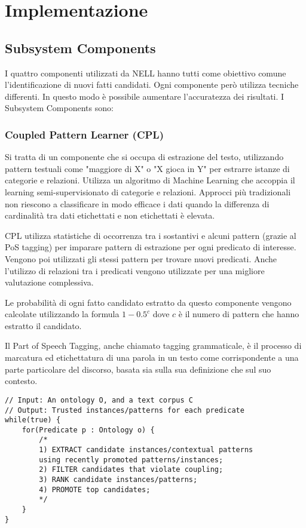 \section{Implementazione}
\label{impl}
\subsection{Subsystem Components}
I quattro componenti utilizzati da NELL hanno tutti come obiettivo comune l'identificazione di nuovi fatti candidati. Ogni componente però utilizza tecniche differenti. In questo modo è possibile aumentare l'accuratezza dei risultati. I Subsystem Components sono:
\subsubsection{Coupled Pattern Learner (CPL)}
Si tratta di un componente che si occupa di estrazione del testo, utilizzando pattern testuali come "maggiore di X" o "X gioca in Y" per estrarre istanze di categorie e relazioni. Utilizza un algoritmo di Machine Learning che accoppia il learning semi-supervisionato di categorie e relazioni. Approcci più tradizionali non riescono a classificare in modo efficace i dati quando la differenza di cardinalità tra dati etichettati e non etichettati è elevata.

\noindent CPL utilizza statistiche di occorrenza tra i sostantivi e alcuni pattern (grazie al PoS tagging) per imparare pattern di estrazione per ogni predicato di interesse. Vengono poi utilizzati gli stessi pattern per trovare nuovi predicati.
Anche l'utilizzo di relazioni tra i predicati vengono utilizzate per una migliore valutazione complessiva.

\noindent Le probabilità di ogni fatto candidato estratto da questo componente vengono calcolate utilizzando la formula $1 - 0.5^{c}$ dove $c$ è il numero di pattern che hanno estratto il candidato\cite{TowardAnArchitecture:online}.
\begin{info}
	Il Part of Speech Tagging, anche chiamato tagging grammaticale, è il processo di marcatura ed etichettatura di una parola in un testo come corrispondente a una parte particolare del discorso, basata sia sulla sua definizione che sul suo contesto\cite{POStagsa85:online}.
\end{info}

\begin{code}
\begin{verbatim}
// Input: An ontology O, and a text corpus C 
// Output: Trusted instances/patterns for each predicate
while(true) {
	for(Predicate p : Ontology o) {
		/*
		1) EXTRACT candidate instances/contextual patterns 
		using recently promoted patterns/instances;
		2) FILTER candidates that violate coupling;
		3) RANK candidate instances/patterns;
		4) PROMOTE top candidates;
		*/
	}
}
\end{verbatim}
\end{code}


